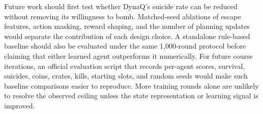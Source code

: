 \documentclass[article, 10pt]{IEEEtran}
\begin{document}
Future work should first test whether DynaQ's suicide rate can be reduced without removing its willingness to bomb. Matched-seed ablations of escape features, action masking, reward shaping, and the number of planning updates would separate the contribution of each design choice. A standalone rule-based baseline should also be evaluated under the same 1,000-round protocol before claiming that either learned agent outperforms it numerically. For future course iterations, an official evaluation script that records per-agent scores, survival, suicides, coins, crates, kills, starting slots, and random seeds would make such baseline comparisons easier to reproduce. More training rounds alone are unlikely to resolve the observed ceiling unless the state representation or learning signal is improved.





\end{document}
